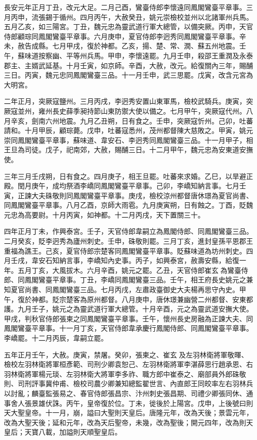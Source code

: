 \begin{pinyinscope}
 長安元年正月丁丑，改元大足。二月己酉，鸞臺侍郎李懷遠同鳳閣鸞臺平章事。三月丙申，流張錫于循州。四月丙午，大赦癸丑，姚元崇檢校並州以北諸軍州兵馬。五月乙亥，如三陽宮。丁丑，魏元忠為靈武道行軍大總管，以備突厥。丙申，天官侍郎顧琮同鳳閣鸞臺平章事。六月庚申，夏官侍郎李迥秀同鳳閣鸞臺平章事。辛未，赦告成縣。七月甲戌，復於神都。乙亥，揚、楚、常、潤、蘇五州地震。壬午，蘇味道按察幽、平等州兵馬。甲申，李懷遠罷。九月壬申，殺邵王重潤及永泰郡主、主婿武延基。十月壬寅，如京師。辛酉，大赦，改元。給復關內三年，賜酺三日。丙寅，魏元忠同鳳閣鸞臺三品。十一月壬申，武三思罷。戊寅，改含元宮為大明宮。



 二年正月，突厥寇鹽州。三月丙戌，李迥秀安置山東軍馬，檢校武騎兵。庚寅，突厥寇並州，雍州長史薛季昶持節山東防禦大使以備之。七月甲午，突厥寇代州。八月辛亥，劍南六州地震。九月乙丑朔，日有食之。壬申，突厥寇忻州。己卯，吐蕃請和。十月甲辰，顧琮薨。戊申，吐蕃寇悉州，茂州都督陳大慈敗之。甲寅，姚元崇同鳳閣鸞臺平章事，蘇味道、韋安石、李迥秀同鳳閣鸞臺三品。十一月甲子，相王旦為司徒。戊子，祀南郊，大赦，賜酺三日。十二月甲午，魏元忠為安東道安撫使。



 三年三月壬戌朔，日有食之。四月庚子，相王旦罷。吐蕃來求婚。乙巳，以旱避正殿。閏月庚午，成均祭酒李嶠同鳳閣鸞臺平章事。己卯，李嶠知納言事。七月壬寅，正諫大夫硃敬則同鳳閣鸞臺平章事。庚戌，檢校涼州都督唐休璟為夏官尚書、同鳳閣鸞臺平章事。八月乙酉，京師大雨雹。九月庚寅朔，日有蝕之。丁酉，貶魏元忠為高要尉。十月丙寅，如神都。十二月丙戌，天下置關三十。



 四年正月丁未，作興泰宮。壬子，天官侍郎韋嗣立為鳳閣侍郎、同鳳閣鸞臺三品。二月癸亥，貶李迥秀為廬州刺史。壬申，硃敬則罷。三月丁亥，進封皇孫平恩郡王重福為譙王。己亥，夏官侍郎宗楚客同鳳閣鸞臺平章事。貶蘇味道為坊州刺史。四月壬戌，韋安石知納言事，李嶠知內史事。丙子，如興泰宮，赦壽安縣，給復一年。五月丁亥，大風拔木。六月辛酉，姚元之罷。乙丑，天官侍郎崔玄為鸞臺侍郎、同鳳閣鸞臺平章事。丁丑，李嶠同鳳閣鸞臺三品。壬午，相王府長史姚元之兼知夏官尚書、同鳳閣鸞臺三品。七月丙戌，左肅政臺御史大夫楊再思守內史。甲午，復於神都。貶宗楚客為原州都督。八月庚申，唐休璟兼幽營二州都督、安東都護。九月壬子，姚元之為靈武道行軍大總管。十月辛酉，元之為靈武道安撫大使。甲戌，判秋官侍郎張柬之同鳳閣鸞臺平章事。壬午，懷州長史房融為正諫大夫、同鳳閣鸞臺平章事。十一月丁亥，天官侍郎韋承慶行鳳閣侍郎、同鳳閣鸞臺平章事。李嶠罷。十二月丙辰，韋嗣立罷。



 五年正月壬午，大赦。庚寅，禁屠。癸卯，張柬之、崔玄及左羽林衛將軍敬暉、檢校左羽林衛將軍桓彥範、司刑少卿袁恕己、左羽林衛將軍李湛薛思行趙承恩、右羽林衛將軍楊元琰、左羽林衛大將軍李多祚、職方郎中崔泰之、廟部員外郎硃敬則、司刑評事冀仲甫、檢校司農少卿兼知總監翟世言、內直郎王同皎率左右羽林兵以討亂；麟臺監張易之、春官侍郎張昌宗、汴州刺史張昌期、司禮少卿張同休、通事舍人張景雄伏誅。丙午，皇帝復於位。丁未，徙後於上陽宮。戊申，上後號曰則天大聖皇帝。十一月，崩，謚曰大聖則天皇后。唐隆元年，改為天後；景雲元年，改為大聖天後；延和元年，改為天后聖帝，未幾，改為聖後；開元四年，改為則天皇后；天寶八載，加謚則天順聖皇后。




\end{pinyinscope}

